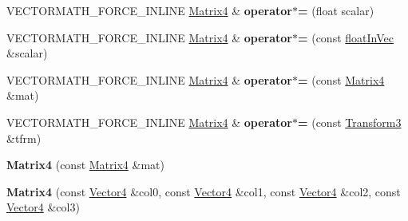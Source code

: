 \begin{DoxyCompactItemize}
\item 
\mbox{\label{classVectormath_1_1Aos_1_1Matrix4_a718608f1c2af046b99b6f7d376b9517a}} 
V\+E\+C\+T\+O\+R\+M\+A\+T\+H\+\_\+\+F\+O\+R\+C\+E\+\_\+\+I\+N\+L\+I\+NE \hyperlink{classVectormath_1_1Aos_1_1Matrix4}{Matrix4} \& {\bfseries operator$\ast$=} (float scalar)
\item 
\mbox{\label{classVectormath_1_1Aos_1_1Matrix4_a0393f922d365e5b8db3d3bccf6130810}} 
V\+E\+C\+T\+O\+R\+M\+A\+T\+H\+\_\+\+F\+O\+R\+C\+E\+\_\+\+I\+N\+L\+I\+NE \hyperlink{classVectormath_1_1Aos_1_1Matrix4}{Matrix4} \& {\bfseries operator$\ast$=} (const \hyperlink{classVectormath_1_1floatInVec}{float\+In\+Vec} \&scalar)
\item 
\mbox{\label{classVectormath_1_1Aos_1_1Matrix4_afecea56563bfecaa57607e583f344ff5}} 
V\+E\+C\+T\+O\+R\+M\+A\+T\+H\+\_\+\+F\+O\+R\+C\+E\+\_\+\+I\+N\+L\+I\+NE \hyperlink{classVectormath_1_1Aos_1_1Matrix4}{Matrix4} \& {\bfseries operator$\ast$=} (const \hyperlink{classVectormath_1_1Aos_1_1Matrix4}{Matrix4} \&mat)
\item 
\mbox{\label{classVectormath_1_1Aos_1_1Matrix4_aef527a3bf6a07c72e7b0e39bf2f6360a}} 
V\+E\+C\+T\+O\+R\+M\+A\+T\+H\+\_\+\+F\+O\+R\+C\+E\+\_\+\+I\+N\+L\+I\+NE \hyperlink{classVectormath_1_1Aos_1_1Matrix4}{Matrix4} \& {\bfseries operator$\ast$=} (const \hyperlink{classVectormath_1_1Aos_1_1Transform3}{Transform3} \&tfrm)
\item 
\mbox{\label{classVectormath_1_1Aos_1_1Matrix4_a025fe2cfa1581016444f2306c1112344}} 
{\bfseries Matrix4} (const \hyperlink{classVectormath_1_1Aos_1_1Matrix4}{Matrix4} \&mat)
\item 
\mbox{\label{classVectormath_1_1Aos_1_1Matrix4_aacf4de7f6db283ad9004ca4328786ce9}} 
{\bfseries Matrix4} (const \hyperlink{classVectormath_1_1Aos_1_1Vector4}{Vector4} \&col0, const \hyperlink{classVectormath_1_1Aos_1_1Vector4}{Vector4} \&col1, const \hyperlink{classVectormath_1_1Aos_1_1Vector4}{Vector4} \&col2, const \hyperlink{classVectormath_1_1Aos_1_1Vector4}{Vector4} \&col3)
\item 
\mbox{\label{classVectormath_1_1Aos_1_1Matrix4_a3fa883e2169015e3de19961e2c1256a1}} 

\end{DoxyCompactItemize}
